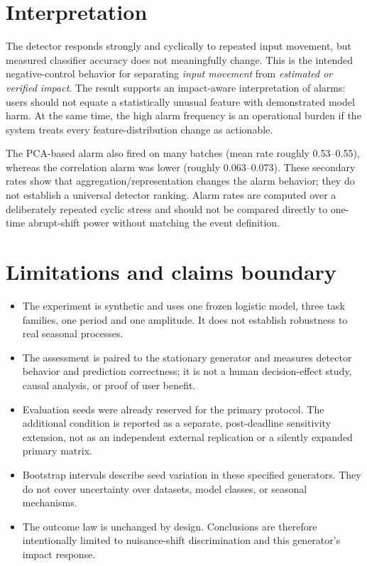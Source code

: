 \documentclass[11pt]{article}
\begin{document}
\section{Interpretation}
The detector responds strongly and cyclically to repeated input movement, but measured classifier accuracy does not meaningfully change. This is the intended negative-control behavior for separating \emph{input movement} from \emph{estimated or verified impact}. The result supports an impact-aware interpretation of alarms: users should not equate a statistically unusual feature with demonstrated model harm. At the same time, the high alarm frequency is an operational burden if the system treats every feature-distribution change as actionable.

The PCA-based alarm also fired on many batches (mean rate roughly 0.53--0.55), whereas the correlation alarm was lower (roughly 0.063--0.073). These secondary rates show that aggregation/representation changes the alarm behavior; they do not establish a universal detector ranking. Alarm rates are computed over a deliberately repeated cyclic stress and should not be compared directly to one-time abrupt-shift power without matching the event definition.

\clearpage
\section{Limitations and claims boundary}
\begin{itemize}
\item The experiment is synthetic and uses one frozen logistic model, three task families, one period and one amplitude. It does not establish robustness to real seasonal processes.
\item The assessment is paired to the stationary generator and measures detector behavior and prediction correctness; it is not a human decision-effect study, causal analysis, or proof of user benefit.
\item Evaluation seeds were already reserved for the primary protocol. The additional condition is reported as a separate, post-deadline sensitivity extension, not as an independent external replication or a silently expanded primary matrix.
\item Bootstrap intervals describe seed variation in these specified generators. They do not cover uncertainty over datasets, model classes, or seasonal mechanisms.
\item The outcome law is unchanged by design. Conclusions are therefore intentionally limited to nuisance-shift discrimination and this generator's impact response.
\end{itemize}
\end{document}
